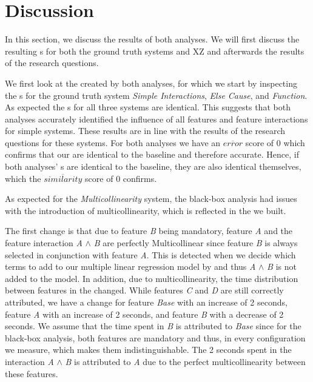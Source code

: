 
\section{Discussion}\label{sec:discussion}

In this section, we discuss the results of both analyses. We will first discuss the resulting {\perfInfluenceModel}s 
for both the ground truth systems and \textsc{XZ} and afterwards the results of the research questions.

We first look at the {\perfInfluenceModel} created by both analyses,
for which we start by inspecting the {\perfInfluenceModel}s for the ground truth system \emph{Simple Interactions},
\emph{Else Cause}, and \emph{Function}. As expected the {\perfInfluenceModel}s for all three systems are identical.
This suggests that both analyses accurately identified the influence of all features and feature interactions for simple systems.
These results are in line with the results of the research questions for these systems.
For both analyses we have an $\overline{error}$ score of $0$ which confirms that our {\perfInfluenceModel} are identical to the baseline and
therefore  accurate. Hence, if both analyses' {\perfInfluenceModel}s are identical to the baseline, they are also identical themselves,
which the $\overline{similarity}$ score of $0$ confirms.

As expected for the \emph{Multicollinearity} system, the black-box analysis had issues with the introduction of multicollinearity, 
which is reflected in the {\perfInfluenceModel} we built.

The first change is that due to feature \emph{B} being mandatory,
feature \emph{A} and the feature interaction \emph{A} $\land$ \emph{B} are perfectly Multicollinear since feature \emph{B}
is always selected in conjunction with feature \emph{A}.
This is detected when we decide which terms to add to our multiple linear regression model by 
and thus \emph{A} $\land$ \emph{B} is not added to the model. In addition, due to multicollinearity, the time distribution between features in the
{\perfInfluenceModel} changed. While features \emph{C} and \emph{D} are still correctly attributed,
we have a change for feature \emph{Base} with an increase of 2 seconds, feature \emph{A} with an increase of 2 seconds,
and feature \emph{B} with a decrease of 2 seconds.
We assume that the time spent in \emph{B} is attributed to \emph{Base} since for the black-box analysis, both features are mandatory and
thus, in every configuration we measure, which makes them indistinguishable.
The 2 seconds spent in the interaction \emph{A} $\land$ \emph{B} is attributed to \emph{A} due to the perfect multicollinearity 
between these features. 

